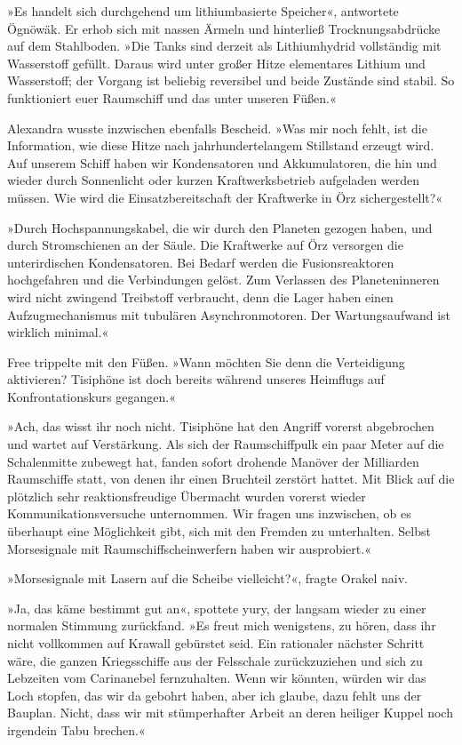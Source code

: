 »Es handelt sich durchgehend um lithiumbasierte Speicher«, antwortete Ögnöwäk. Er erhob sich mit nassen Ärmeln und hinterließ Trocknungsabdrücke auf dem Stahlboden. »Die Tanks sind derzeit als Lithiumhydrid vollständig mit Wasserstoff gefüllt. Daraus wird unter großer Hitze elementares Lithium und Wasserstoff; der Vorgang ist beliebig reversibel und beide Zustände sind stabil. So funktioniert euer Raumschiff und das unter unseren Füßen.«

Alexandra wusste inzwischen ebenfalls Bescheid. »Was mir noch fehlt, ist die Information, wie diese Hitze nach jahrhundertelangem Stillstand erzeugt wird. Auf unserem Schiff haben wir Kondensatoren und Akkumulatoren, die hin und wieder durch Sonnenlicht oder kurzen Kraftwerksbetrieb aufgeladen werden müssen. Wie wird die Einsatzbereitschaft der Kraftwerke in Örz sichergestellt?«

»Durch Hochspannungskabel, die wir durch den Planeten gezogen haben, und durch Stromschienen an der Säule. Die Kraftwerke auf Örz versorgen die unterirdischen Kondensatoren. Bei Bedarf werden die Fusionsreaktoren hochgefahren und die Verbindungen gelöst. Zum Verlassen des Planeteninneren wird nicht zwingend Treibstoff verbraucht, denn die Lager haben einen Aufzugmechanismus mit tubulären Asynchronmotoren. Der Wartungsaufwand ist wirklich minimal.«

Free trippelte mit den Füßen. »Wann möchten Sie denn die Verteidigung aktivieren? Tisiphöne ist doch bereits während unseres Heimflugs auf Konfrontationskurs gegangen.«

»Ach, das wisst ihr noch nicht. Tisiphöne hat den Angriff vorerst abgebrochen und wartet auf Verstärkung. Als sich der Raumschiffpulk ein paar Meter auf die Schalenmitte zubewegt hat, fanden sofort drohende Manöver der Milliarden Raumschiffe statt, von denen ihr einen Bruchteil zerstört hattet. Mit Blick auf die plötzlich sehr reaktionsfreudige Übermacht wurden vorerst wieder Kommunikationsversuche unternommen. Wir fragen uns inzwischen, ob es überhaupt eine Möglichkeit gibt, sich mit den Fremden zu unterhalten. Selbst Morsesignale mit Raumschiffscheinwerfern haben wir ausprobiert.«

»Morsesignale mit Lasern auf die Scheibe vielleicht?«, fragte Orakel naiv.

»Ja, das käme bestimmt gut an«, spottete yury, der langsam wieder zu einer normalen Stimmung zurückfand. »Es freut mich wenigstens, zu hören, dass ihr nicht vollkommen auf Krawall gebürstet seid. Ein rationaler nächster Schritt wäre, die ganzen Kriegsschiffe aus der Felsschale zurückzuziehen und sich zu Lebzeiten vom Carinanebel fernzuhalten. Wenn wir könnten, würden wir das Loch stopfen, das wir da gebohrt haben, aber ich glaube, dazu fehlt uns der Bauplan. Nicht, dass wir mit stümperhafter Arbeit an deren heiliger Kuppel noch irgendein Tabu brechen.«


